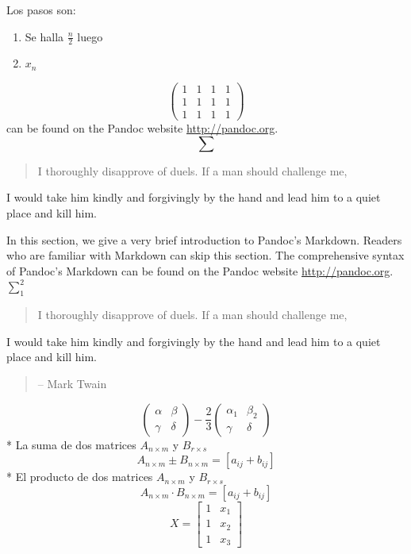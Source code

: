 \documentclass[10pt,]{krantz}
\providecommand{\tightlist}{%
  \setlength{\itemsep}{0pt}\setlength{\parskip}{0pt}}
\theoremstyle{definition}
\theoremstyle{definition}
\theoremstyle{definition}
\theoremstyle{definition}
\theoremstyle{remark}
\begin{document}
Los pasos son:

\begin{enumerate}
\def\labelenumi{\arabic{enumi}.}
\tightlist
\item
  Se halla \(\frac{n}{2}\) luego
\item
  \(x_n\)
\end{enumerate}

\[ \begin{pmatrix}
1&1&1&1\\
1&1&1&1\\
1&1&1&1
\end{pmatrix}\]
can be found on the Pandoc website \url{http://pandoc.org}.
\[\sum\]

\begin{quote}
I thoroughly disapprove of duels. If a man should challenge me,
\end{quote}

I would take him kindly and forgivingly by the hand and lead him
to a quiet place and kill him.

In this section, we give a very brief introduction to Pandoc's Markdown. Readers who are familiar with Markdown can skip this section. The comprehensive syntax of Pandoc's Markdown can be found on the Pandoc website \url{http://pandoc.org}. \(\sum_1^2\)

\begin{quote}
I thoroughly disapprove of duels. If a man should challenge me,
\end{quote}

I would take him kindly and forgivingly by the hand and lead him
to a quiet place and kill him.

\begin{quote}
-- Mark Twain
\end{quote}

\[\begin{pmatrix}\alpha & \beta\\
\gamma & \delta
\end{pmatrix}-\frac{2}{3} \begin{pmatrix}\alpha_1 & \beta_2\\
\gamma & \delta
\end{pmatrix}\]
* La suma de dos matrices \(A_{n\times m}\) y \(B_{r\times s}\) \[A_{n\times m}\pm B_{n\times m}=[a_{ij}+b_{ij}]\]
* El producto de dos matrices \(A_{n\times m}\) y \(B_{r\times s}\) \[A_{n\times m}\cdot B_{n\times m}=[a_{ij}+b_{ij}]\]
\[X = \begin{bmatrix}1 & x_{1}\\
1 & x_{2}\\
1 & x_{3}
\end{bmatrix}\]
\end{document}
